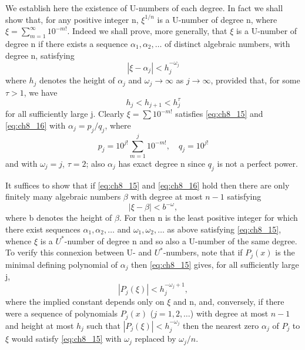 We establish here the existence of U-numbers of each degree. In fact we shall show that, for any positive integer n, $\xi^{1/n}$ is a U-number of degree n, where $\xi = \sum_{m=1}^{\infty} 10^{-m!}$. Indeed we shall prove, more generally, that $\xi$ is a U-number of degree n if there exists a sequence $\alpha_1, \alpha_2, \dots$ of distinct algebraic numbers, with degree n, satisfying
\[|\xi - \alpha_j| < h_j^{-\omega_j} \tag{15}\label{eq:ch8_15}\]
where $h_j$ denotes the height of $\alpha_j$ and $\omega_j \to \infty$ as $j \to \infty$, provided that, for some $\tau > 1$, we have
\[h_j < h_{j+1} < h_j^{\tau} \tag{16}\label{eq:ch8_16}\]
for all sufficiently large j. Clearly $\xi = \sum 10^{-m!}$ satisfies \eqref{eq:ch8_15} and \eqref{eq:ch8_16} with $\alpha_j = p_j/q_j$, where
\[p_j = 10^{j!} \sum_{m=1}^{j} 10^{-m!}, \quad q_j = 10^{j!}\]
and with $\omega_j = j$, $\tau = 2$; also $\alpha_j$ has exact degree n since $q_j$ is not a perfect power.

It suffices to show that if \eqref{eq:ch8_15} and \eqref{eq:ch8_16} hold then there are only finitely many algebraic numbers $\beta$ with degree at most $n-1$ satisfying
\[|\xi - \beta| < b^{-\omega}, \tag{17}\label{eq:ch8_17}\]
where b denotes the height of $\beta$. For then n is the least positive integer for which there exist sequences $\alpha_1, \alpha_2, \dots$ and $\omega_1, \omega_2, \dots$ as above satisfying \eqref{eq:ch8_15}, whence $\xi$ is a $U^*$-number of degree n and so also a U-number of the same degree. To verify this connexion between U- and $U^*$-numbers, note that if $P_j(x)$ is the minimal defining polynomial of $\alpha_j$ then \eqref{eq:ch8_15} gives, for all sufficiently large j,
\[|P_j(\xi)| < h_j^{-\omega_j+1},\]
where the implied constant depends only on $\xi$ and n, and, conversely, if there were a sequence of polynomials $P_j(x)$ ($j=1,2,\dots$) with degree at most $n-1$ and height at most $h_j$ such that $|P_j(\xi)| < h_j^{-\omega_j}$ then the nearest zero $\alpha_j$ of $P_j$ to $\xi$ would satisfy \eqref{eq:ch8_15} with $\omega_j$ replaced by $\omega_j/n$.


